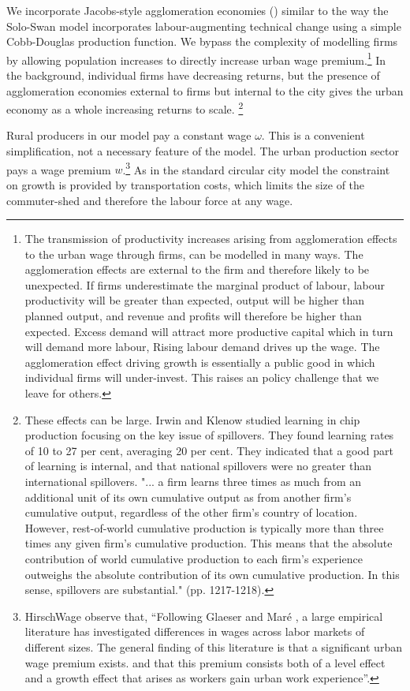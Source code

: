 We  incorporate Jacobs-style agglomeration economies (\cite{beaudryWhoRightMarshall2009, vanderpanneAgglomerationExternalitiesMarshall2004, jacobsEconomyCities1969})  similar to the way the  Solo-Swan model incorporates  labour-augmenting technical change using a simple Cobb-Douglas production function.  We bypass the complexity of modelling firms  by allowing population increases  to directly increase urban wage premium.\footnote{The transmission of productivity increases arising from agglomeration effects  to the urban wage through firms, can be modelled in many ways. The agglomeration effects are external to the firm and therefore likely to be unexpected. If  firms underestimate the marginal product of labour, labour productivity will be greater than expected, output will be higher than planned output, and revenue and profits will therefore be higher than expected. Excess demand will attract more productive capital which in turn will demand more labour,  Rising labour demand drives up the wage. The agglomeration effect driving growth is essentially a public good in which individual firms will under-invest. This raises an policy challenge that we leave for others.} %
In the background, individual firms have decreasing returns, but the presence of agglomeration economies external to firms but internal to the city gives the urban economy as a whole increasing returns to scale. \footnote{These effects can be large. Irwin and Klenow  studied learning in chip production focusing  on the key issue of spillovers. They found learning rates of 10 to 27 per cent, averaging 20 per cent. They indicated that a good part of learning is internal, and that national spillovers were no greater than international spillovers. "... a firm learns three times as much from an additional unit of its own cumulative output as from another firm's cumulative output, regardless of the other firm's country of location. However, rest-of-world cumulative production is typically more than three times any given firm's cumulative production. This means that the absolute contribution of world cumulative production to each firm's experience outweighs the absolute contribution of its own cumulative production. In this sense, spillovers are substantial." (pp. 1217-1218).} 

Rural producers in our model pay a constant wage $\omega$. This is a convenient simplification, not a necessary feature of the model. The urban production sector pays a wage premium $w$.\footnote{
HirschWage \cite{hirschUrbanWagePremium2019} observe that, ``Following Glaeser and Maré \cite{glaeserCitiesSkills2001},  a  large  empirical  literature  has  investigated differences in wages across labor markets of different sizes. The general finding of this literature is that a significant urban wage premium exists. and that this premium consists both of a level effect and a growth effect that arises as workers gain urban work experience''. } As in the standard circular city model the constraint on growth is provided by transportation costs, which limits the size of the commuter-shed and therefore the labour force at any wage. 

